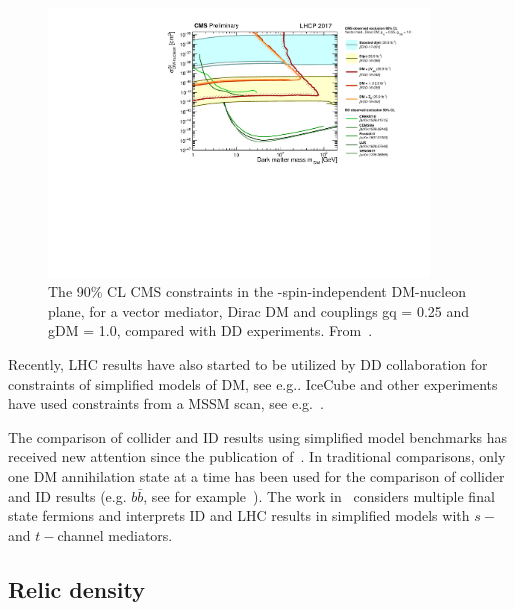 \begin{figure}[!htpb]
\includegraphics[width=0.9\textwidth]{figures/SI_CMSDD_Summary}
\caption{The 90\% CL CMS constraints in the \mdm-spin-independent DM-nucleon plane, for a vector mediator, Dirac DM and couplings gq = 0.25 and gDM = 1.0, compared with DD experiments. From~\cite{CMSSummary}.}
\label{fig:SICMS}
\end{figure}

Recently, LHC results have also started to be utilized by DD collaboration for constraints of simplified models of DM, see e.g.\cite{PhysRevLett.118.251301,Balazs:2017hxh}. IceCube and other experiments have used constraints from a MSSM scan, see e.g.~\cite{Aartsen:2016zhm}.

The comparison of collider and ID results using simplified model benchmarks has received new attention since the publication of~\cite{Boveia:2016mrp}. In traditional comparisons, only one DM annihilation state at a time has been used for the comparison of collider and ID results (e.g. $b\bar{b}$, see for example~\cite{Agrawal:2014una}). The work in~\cite{Carpenter:2016thc} considers multiple final state fermions and interprets ID and LHC results in simplified models with $s-$ and $t-$channel mediators. 

\subsection{Relic density}

